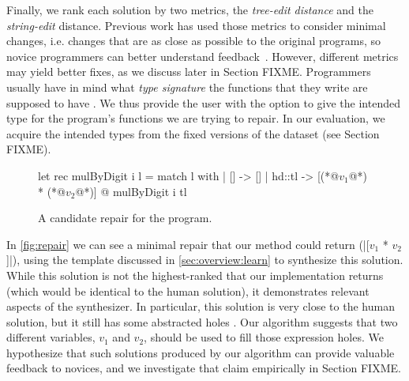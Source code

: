  Finally, we rank each solution by two metrics, the
\emph{tree-edit distance} and the \emph{string-edit} distance. Previous work has
used those metrics to consider minimal changes, i.e. changes that are as close
as possible to the original programs, so novice programmers can better
understand feedback~\cite{FIXME}.
However, different metrics may yield better fixes, as we
discuss later in Section FIXME.
Programmers usually have in mind what \emph{type signature}
the functions that they write are supposed to have
. We thus
provide the user with the option to give the intended type for the program's
functions we are trying to repair. In our evaluation, we acquire the
intended types from the fixed versions of the dataset (see Section FIXME).

\begin{figure}[ht]
  \begin{ecode}
  let rec mulByDigit i l =
    match l with
    | []     -> []
    | hd::tl -> [(*@$v_1$@*) * (*@$v_2$@*)] @ mulByDigit i tl
  \end{ecode}
  \caption{A candidate repair for the \mbd program.}
  \label{fig:repair}
  \end{figure}

 In \autoref{fig:repair} we can see a minimal repair that our
method could return (|[$v_1$ * $v_2$]|), using the template discussed in
\autoref{sec:overview:learn} to synthesize this solution. While this solution
is not the highest-ranked that our implementation returns (which would be
identical to the human solution), it demonstrates
relevant aspects of the synthesizer. In particular, this solution
is very close to the human solution, but it still has
some abstracted holes .
Our algorithm suggests that two different variables, $v_1$ and $v_2$,
should be used to fill those expression holes. We hypothesize that
such solutions produced by our algorithm can provide
valuable feedback to novices, and we investigate that claim empirically
in Section FIXME.
